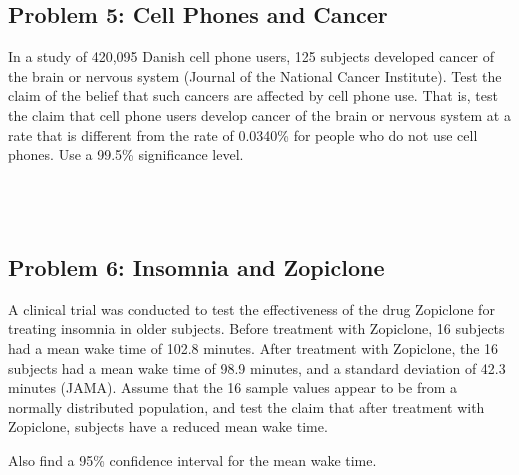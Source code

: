 \documentclass[]{article}
\begin{document}
\hypertarget{problem-5-cell-phones-and-cancer}{%
\subsection{Problem 5: Cell Phones and
Cancer}\label{problem-5-cell-phones-and-cancer}}

In a study of 420,095 Danish cell phone users, 125 subjects developed
cancer of the brain or nervous system (Journal of the National Cancer
Institute). Test the claim of the belief that such cancers are affected
by cell phone use. That is, test the claim that cell phone users develop
cancer of the brain or nervous system at a rate that is different from
the rate of 0.0340\% for people who do not use cell phones. Use a 99.5\%
significance level.

\hypertarget{section-8}{%
\subsection{\texorpdfstring{\(\;\)}{\textbackslash{};}}\label{section-8}}

\hypertarget{section-9}{%
\subsection{\texorpdfstring{\(\;\)}{\textbackslash{};}}\label{section-9}}

\hypertarget{problem-6-insomnia-and-zopiclone}{%
\subsection{Problem 6: Insomnia and
Zopiclone}\label{problem-6-insomnia-and-zopiclone}}

A clinical trial was conducted to test the effectiveness of the drug
Zopiclone for treating insomnia in older subjects. Before treatment with
Zopiclone, 16 subjects had a mean wake time of 102.8 minutes. After
treatment with Zopiclone, the 16 subjects had a mean wake time of 98.9
minutes, and a standard deviation of 42.3 minutes (JAMA). Assume that
the 16 sample values appear to be from a normally distributed
population, and test the claim that after treatment with Zopiclone,
subjects have a reduced mean wake time.

Also find a 95\% confidence interval for the mean wake time.

\hypertarget{section-10}{%
\subsection{\texorpdfstring{\(\;\)}{\textbackslash{};}}\label{section-10}}

\hypertarget{section-11}{%
\subsection{\texorpdfstring{\(\;\)}{\textbackslash{};}}\label{section-11}}
\end{document}
